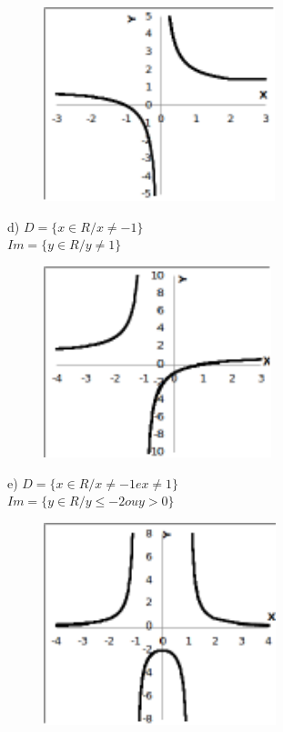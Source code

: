 \begin{respostas}{3}
	\begin{figure}[H]
		\begin{Center}
			\includegraphics[width=2.65in,height=2.22in]{capitulos/outras_funcoes/media/image42.pdf}
		\end{Center}
	\end{figure}

	d)  \( D= \{ x \in R/x \neq -1 \}\)\\\(Im= \{ y \in R/y \neq 1 \}  \) 

	\begin{figure}[H]
		\begin{Center}
			\includegraphics[width=2.6in,height=2.19in]{capitulos/outras_funcoes/media/image43.pdf}
		\end{Center}
	\end{figure}

	e)  \( D= \{ x \in R/x \neq -1 e x \neq 1 \}  \)\\ \( Im= \{ y \in R/y \leq -2 ou y>0 \}  \)

	\begin{figure}[H]
		\begin{Center}
			\includegraphics[width=2.66in,height=2.31in]{capitulos/outras_funcoes/media/image44.pdf}
		\end{Center}
	\end{figure}


\end{respostas}
